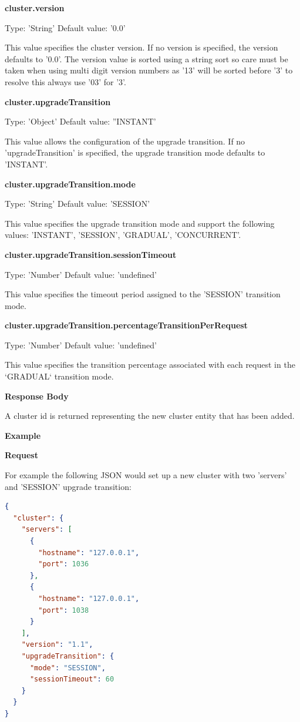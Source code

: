 \documentclass[a4paper,11pt,twoside]{report}
\begin{document}
\begin{appendices}
\noindent
\textbf{cluster.version}

\noindent
Type: 'String' Default value: '0.0'\smallskip

\noindent
This value specifies the cluster version. If no version is specified, the version defaults to '0.0'.  The version value is sorted using a string sort so care must be taken when using multi digit version numbers as '13' will be sorted before '3' to resolve this always use '03' for '3'. \bigskip

\noindent
\textbf{cluster.upgradeTransition}

\noindent
Type: 'Object' Default value: ''INSTANT'\smallskip

\noindent
This value allows the configuration of the upgrade transition. If no 'upgradeTransition' is specified, the upgrade transition mode defaults to 'INSTANT'.\bigskip

\noindent
\textbf{cluster.upgradeTransition.mode}

\noindent
Type: 'String' Default value: 'SESSION'\smallskip

\noindent
This value specifies the upgrade transition mode and support the following values: 'INSTANT', 'SESSION', 'GRADUAL', 'CONCURRENT'.\bigskip

\noindent
\textbf{cluster.upgradeTransition.sessionTimeout}

\noindent
Type: 'Number' Default value: 'undefined'\smallskip

\noindent
This value specifies the timeout period assigned to the 'SESSION' transition mode. \bigskip

\noindent
\textbf{cluster.upgradeTransition.percentageTransitionPerRequest}

\noindent
Type: 'Number' Default value: 'undefined'\smallskip

\noindent
This value specifies the transition percentage associated with each request in the `GRADUAL` transition mode. \bigskip

\noindent
\textbf{Response Body}

\noindent
A cluster id is returned representing the new cluster entity that has been added. \bigskip

\noindent
\textbf{Example}\bigskip

\noindent
\textbf{Request}

\noindent
For example the following JSON would set up a new cluster with two 'servers' and 'SESSION' upgrade transition:\bigskip

\begin{lstlisting}[language=json]
{
  "cluster": {
    "servers": [
      {
        "hostname": "127.0.0.1", 
        "port": 1036
      },  
      {
        "hostname": "127.0.0.1", 
        "port": 1038
      }
    ], 
    "version": "1.1", 
    "upgradeTransition": {
      "mode": "SESSION", 
      "sessionTimeout": 60
    }
  }
}
\end{lstlisting}


\end{appendices}
\end{document}
